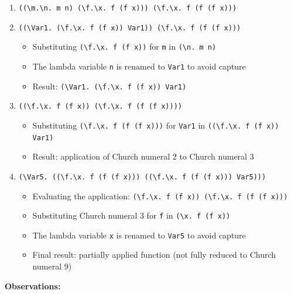 \documentclass{article}
\theoremstyle{theorem}
\theoremstyle{definition}
\theoremstyle{remark}
\begin{document}
\begin{enumerate}
\item \texttt{((\textbackslash m.\textbackslash n. m n) (\textbackslash f.\textbackslash x. f (f x))) (\textbackslash f.\textbackslash x. f (f (f x)))}

\item \texttt{((\textbackslash Var1. (\textbackslash f.\textbackslash x. f (f x)) Var1)) (\textbackslash f.\textbackslash x. f (f (f x)))}
\begin{itemize}
\item Substituting \texttt{(\textbackslash f.\textbackslash x. f (f x))} for \texttt{m} in \texttt{(\textbackslash n. m n)}
\item The lambda variable \texttt{n} is renamed to \texttt{Var1} to avoid capture
\item Result: \texttt{(\textbackslash Var1. (\textbackslash f.\textbackslash x. f (f x)) Var1)}
\end{itemize}

\item \texttt{((\textbackslash f.\textbackslash x. f (f x)) (\textbackslash f.\textbackslash x. f (f (f x))))}
\begin{itemize}
\item Substituting \texttt{(\textbackslash f.\textbackslash x. f (f (f x)))} for \texttt{Var1} in \texttt{((\textbackslash f.\textbackslash x. f (f x)) Var1)}
\item Result: application of Church numeral 2 to Church numeral 3
\end{itemize}

\item \texttt{(\textbackslash Var5. ((\textbackslash f.\textbackslash x. f (f (f x))) ((\textbackslash f.\textbackslash x. f (f (f x))) Var5)))}
\begin{itemize}
\item Evaluating the application: \texttt{(\textbackslash f.\textbackslash x. f (f x)) (\textbackslash f.\textbackslash x. f (f (f x)))}
\item Substituting Church numeral 3 for \texttt{f} in \texttt{(\textbackslash x. f (f x))}
\item The lambda variable \texttt{x} is renamed to \texttt{Var5} to avoid capture
\item Final result: partially applied function (not fully reduced to Church numeral 9)
\end{itemize}
\end{enumerate}

\textbf{Observations:}
\end{document}
